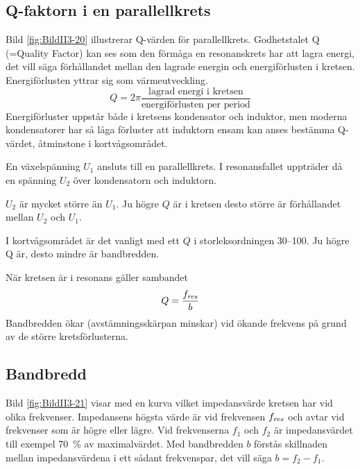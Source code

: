 \subsection{Q-faktorn i en parallellkrets}
\label{Q-faktor}


Bild \ref{fig:BildII3-20} illustrerar Q-värden för parallellkrets.
Godhetstalet Q (=Quality Factor) kan ses som den förmåga en resonanskrets har
att lagra energi, det vill säga förhållandet mellan den lagrade energin och
energiförlusten i kretsen.
Energiförlusten yttrar sig som värmeutveckling.
%
\[
Q = 2\pi \frac{\text{lagrad energi i kretsen}}{\text{energiförlusten per period}}
\]
%
Energiförluster uppstår både i kretsens kondensator och induktor, men moderna
kondensatorer har så låga förluster att induktorn ensam kan anses bestämma
Q-värdet, åtminstone i kortvågsområdet.

En växelspänning \(U_1\) ansluts till en parallellkrets.
I resonansfallet uppträder då en spänning \(U_2\) över kondensatorn och
induktorn.

\(U_2\) är mycket större än \(U_1\).
Ju högre \(Q\) är i kretsen desto större är förhållandet mellan \(U_2\) och
\(U_1\).

I kortvågsområdet är det vanligt med ett \(Q\) i storleksordningen 30--100.
Ju högre Q är, desto mindre är bandbredden.

När kretsen är i resonans gäller sambandet
%
\[Q = \frac{f_{\it res}}{b}\]
%
Bandbredden ökar (avstämningsskärpan minskar) vid ökande frekvens på grund av de
större kretsförlusterna.


\subsection{Bandbredd}

Bild \ref{fig:BildII3-21} visar med en kurva vilket impedansvärde kretsen har
vid olika frekvenser.
Impedansens högsta värde är vid frekvensen \(f_{\it res}\) och avtar vid frekvenser
som är högre eller lägre.
Vid frekvenserna \(f_1\) och \(f_2\) är impedansvärdet till exempel 70~\% av
maximalvärdet.
Med bandbredden \(b\) förstås skillnaden mellan impedansvärdena i ett sådant
frekvenspar, det vill säga \(b = f_2 - f_1\).
